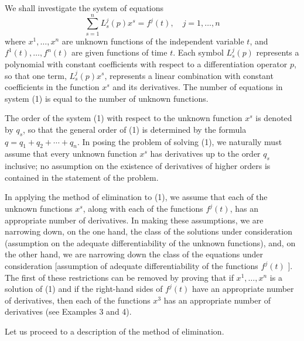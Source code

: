 \documentclass[10pt,a5paper]{book}
\theoremstyle{plain}
\theoremstyle{definition}
\theoremstyle{remark}
\begin{document}
We shall investigate the system of equations
\begin{equation*}
\sum_{s=1}^{n} L_{s}^{j}(p) x^{s}=f^{j}(t), \quad j=1, \ldots, n \tag{1}
\end{equation*}
where $x^{1}, \ldots, x^{n}$ are unknown functions of the independent variable $t$, and $f^{1}(t), \ldots, f^{n}(t)$ are given functions of time $t$. Each symbol $L_{s}^{j}(p)$ represents a polynomial with constant coefficients with respect to a differentiation operator $p$, so that one term, $L_{s}^{j}(p) x^{s}$, represents a linear combination with constant coefficients in the function $x^{s}$ and its derivatives. The number of equations in system (1) is equal to the number of unknown functions.

The order of the system (1) with respect to the unknown function $x^{s}$ is denoted by $q_{s}$, so that the general order of (1) is determined by the formula $q=q_{1}+q_{2}+\cdots+q_{n}$. In posing the problem of solving (1), we naturally must assume that every unknown function $x^{s}$ has derivatives up to the order $q_{s}$ inclusive; no assumption on the existence of derivatives of higher orders is contained in the statement of the problem.

In applying the method of elimination to (1), we assume that each of the unknown functions $x^{s}$, along with each of the functions $f^{j}(t)$, has an
appropriate number of derivatives. In making these assumptions, we are narrowing down, on the one hand, the class of the solutions under consideration (assumption on the adequate differentiability of the unknown functions), and, on the other hand, we are narrowing down the class of the equations under consideration [assumption of adequate differentiability of the functions $f^{j}(t)$ ]. The first of these restrictions can be removed by proving that if $x^{1}, \ldots, x^{n}$ is a solution of (1) and if the right-hand sides of $f^{j}(t)$ have an appropriate number of derivatives, then each of the functions $x^{3}$ has an appropriate number of derivatives (see Examples 3 and 4).

Let us proceed to a description of the method of elimination.
\end{document}
